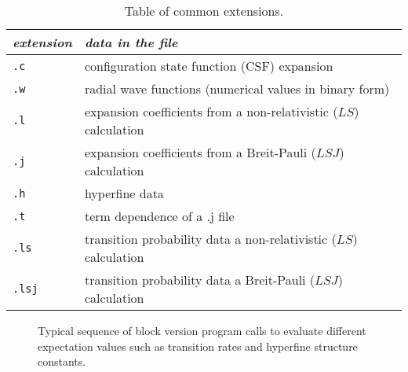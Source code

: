 \documentclass[fleqn,10pt]{book}
\begin{document}
\begin{table}[h!]
\caption{
\label{tab:extension}
 Table of common extensions.}
\begin{center}
\begin{tabular}{l l}
{\sl extension} & {\sl data in the file}\\
\hline
{\tt .c} &  configuration state function (CSF) expansion \\
{\tt .w} &  radial wave functions (numerical values in binary form)\\
{\tt .l} &  expansion coefficients from a non-relativistic ($LS$) calculation\\
{\tt .j} &  expansion coefficients from a Breit-Pauli ($LSJ$) calculation \\
{\tt .h} &  hyperfine data \\
{\tt .t} &  term dependence of a .j file\\
{\tt .ls} &  transition probability data a non-relativistic ($LS$) calculation \\
{\tt .lsj} & transition probability data a Breit-Pauli ($LSJ$) calculation \\
\hline
\end{tabular}
\end{center}
\end{table}

\begin{figure}
\caption{
 \label{fig:flow_blk}
 Typical sequence of block version program calls 
 to evaluate different expectation values such as transition rates and hyperfine structure constants.}
\end{figure}
\end{document}
